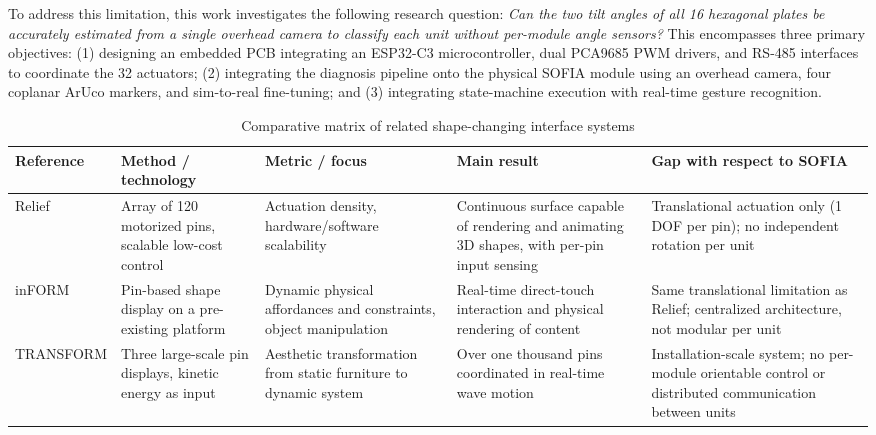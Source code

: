 \documentclass[lettersize,journal]{IEEEtran}
\begin{document}
	To address this limitation, this work investigates the following research question: \textit{Can the two tilt angles of all 16 hexagonal plates be accurately estimated from a single overhead camera to classify each unit without per-module angle sensors?} This encompasses three primary objectives: (1) designing an embedded PCB integrating an ESP32-C3 microcontroller, dual PCA9685 PWM drivers, and RS-485 interfaces to coordinate the 32 actuators; (2) integrating the diagnosis pipeline onto the physical SOFIA module using an overhead camera, four coplanar ArUco markers, and sim-to-real fine-tuning; and (3) integrating state-machine execution with real-time gesture recognition.
	\begin{table}[!t]
		\centering
		\caption{Comparative matrix of related shape-changing interface systems}
		\label{tab:related_work_matrix}
		\scriptsize
		
		\setlength{\tabcolsep}{3pt}
		\renewcommand{\arraystretch}{1.1}
		
		\begin{tabularx}{\textwidth}
			{@{}P{2.2cm} P{3cm} P{3cm} P{4cm} Y@{}}
			
			\toprule
			Reference & Method / technology & Metric / focus & Main result & Gap with respect to SOFIA \\
			\midrule
			
			Relief \cite{leithinger2010relief} &
			Array of 120 motorized pins, scalable low-cost control &
			Actuation density, hardware/software scalability &
			Continuous surface capable of rendering and animating 3D shapes, with per-pin input sensing &
			Translational actuation only (1 DOF per pin); no independent rotation per unit \\
			
			inFORM \cite{follmer2013inform} &
			Pin-based shape display on a pre-existing platform &
			Dynamic physical affordances and constraints, object manipulation &
			Real-time direct-touch interaction and physical rendering of content &
			Same translational limitation as Relief; centralized architecture, not modular per unit \\
			
			TRANSFORM \cite{ishii2015transform} &
			Three large-scale pin displays, kinetic energy as input &
			Aesthetic transformation from static furniture to dynamic system &
			Over one thousand pins coordinated in real-time wave motion &
			Installation-scale system; no per-module orientable control or distributed communication between units \\
			

\end{tabularx}
\end{table}
\end{document}
